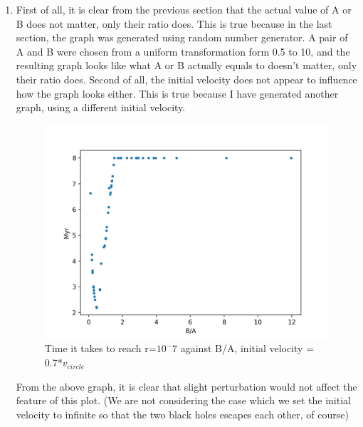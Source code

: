 \documentclass[12pt,letterpaper]{article}
\begin{document}
\begin{enumerate}
    \item
    First of all, it is clear from the previous section that the actual value of A or B does not matter, only their ratio does. This is true because in the last section, the graph was generated using random number generator. A pair of A and B were chosen from a uniform transformation form 0.5 to 10, and the resulting graph looks like what A or B actually equals to doesn't matter, only their ratio does. Second of all, the initial velocity does not appear to influence how the graph looks either. This is true because I have generated another graph, using a different initial velocity.
    
    \begin{figure}[h]
    \centering
    \includegraphics[width=1.\linewidth]{fig2f}
    \caption{Time it takes to reach r=$10^-7$ against B/A, initial velocity =  0.7*$v_{circle}$}
    \end{figure}
    From the above graph, it is clear that slight perturbation would not affect the feature of this plot. (We are not considering the case which we set the initial velocity to infinite so that the two black holes escapes each other, of course)
    
\end{enumerate}
\end{document}
